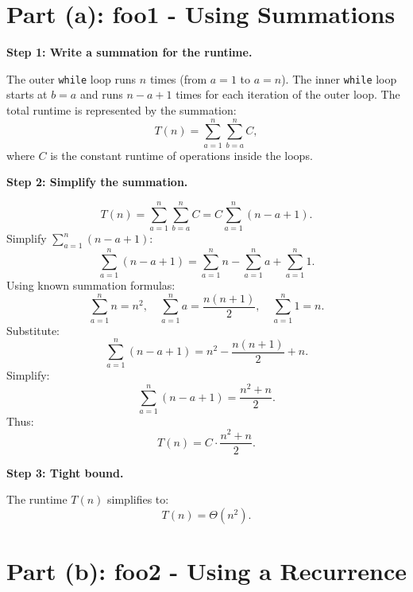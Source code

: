 \documentclass{article}
\begin{document}
\section*{Part (a): foo1 - Using Summations}


\textbf{Step 1: Write a summation for the runtime.}

The outer \texttt{while} loop runs \( n \) times (from \( a = 1 \) to \( a = n \)).  
The inner \texttt{while} loop starts at \( b = a \) and runs \( n - a + 1 \) times for each iteration of the outer loop.  
The total runtime is represented by the summation:
\[
T(n) = \sum_{a=1}^{n} \sum_{b=a}^{n} C,
\]
where \( C \) is the constant runtime of operations inside the loops.

\textbf{Step 2: Simplify the summation.}

\[
T(n) = \sum_{a=1}^{n} \sum_{b=a}^{n} C = C \sum_{a=1}^{n} \left( n - a + 1 \right).
\]
Simplify \( \sum_{a=1}^{n} (n - a + 1) \):
\[
\sum_{a=1}^{n} (n - a + 1) = \sum_{a=1}^{n} n - \sum_{a=1}^{n} a + \sum_{a=1}^{n} 1.
\]
Using known summation formulas:
\[
\sum_{a=1}^{n} n = n^2, \quad \sum_{a=1}^{n} a = \frac{n(n+1)}{2}, \quad \sum_{a=1}^{n} 1 = n.
\]
Substitute:
\[
\sum_{a=1}^{n} (n - a + 1) = n^2 - \frac{n(n+1)}{2} + n.
\]
Simplify:
\[
\sum_{a=1}^{n} (n - a + 1) = \frac{n^2 + n}{2}.
\]
Thus:
\[
T(n) = C \cdot \frac{n^2 + n}{2}.
\]

\textbf{Step 3: Tight bound.}

The runtime \( T(n) \) simplifies to:
\[
T(n) = \Theta(n^2).
\]

\section*{Part (b): foo2 - Using a Recurrence}

\end{document}
